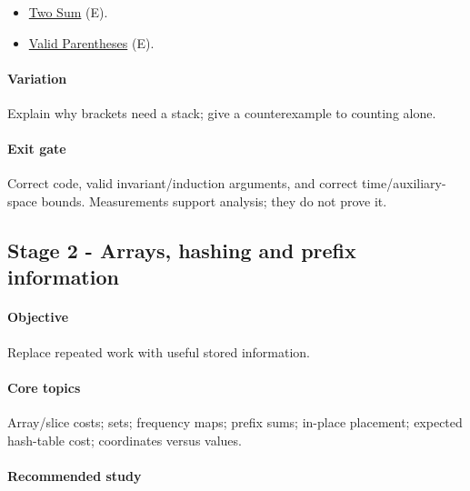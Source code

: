 \documentclass[11pt,letterpaper]{article}
\begin{document}
\begin{itemize}

\item \href{https://leetcode.com/problems/two-sum/}{Two Sum} (E).

\item \href{https://leetcode.com/problems/valid-parentheses/}{Valid Parentheses} (E).

\end{itemize}

\paragraph*{Variation}

Explain why brackets need a stack; give a counterexample to counting alone.

\paragraph*{Exit gate}

Correct code, valid invariant/induction arguments, and correct time/auxiliary-space bounds. Measurements support analysis; they do not prove it.

\par{}
\begin{samepage}
\section{Stage 2 - Arrays, hashing and prefix information}\label{sec:6}

\label{stage:2}


\paragraph*{Objective}

Replace repeated work with useful stored information.

\end{samepage}

\paragraph*{Core topics}

Array/slice costs; sets; frequency maps; prefix sums; in-place placement; expected hash-table cost; coordinates versus values.

\paragraph*{Recommended study}
\end{document}
